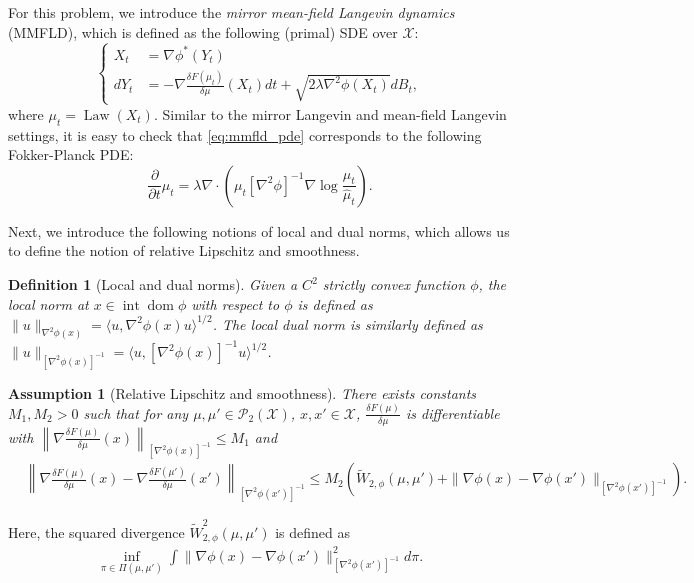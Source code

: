 \documentclass{article}
\newtheorem{definition}{Definition}
\newtheorem{assumption}{Assumption}
\begin{document}
For this problem, we introduce the \emph{mirror mean-field Langevin dynamics} (MMFLD), which is defined as the following (primal) SDE over $\mathcal{X}$:
\begin{equation}\label{eq:mmfld_sde}
\begin{cases}
    X_t &= \nabla\phi^*(Y_t)\\
    dY_t &= -\nabla\frac{\delta F(\mu_t)}{\delta\mu}(X_t)dt + \sqrt{2\lambda\nabla^2\phi(X_t)}dB_t,
\end{cases}
\end{equation}
where $\mu_t = \operatorname{Law}(X_t)$. Similar to the mirror Langevin and mean-field Langevin settings, it is easy to check that \eqref{eq:mmfld_pde} corresponds to the following Fokker-Planck PDE: 
\begin{equation}
\frac{\partial}{\partial t}\mu_t = \lambda \nabla \cdot \left(\mu_t [\nabla^2\phi]^{-1}\nabla \log \frac{\mu_t}{\hat{\mu}_t}\right).\label{eq:mmfld_pde}   
\end{equation}

Next, we introduce the following notions of local and dual norms, which allows us to define the notion of relative Lipschitz and smoothness.
\begin{definition}[Local and dual norms]
    Given a $C^2$ strictly convex function $\phi$, the local norm at $x\in \operatorname{int}\operatorname{dom}\phi$ with respect to $\phi$ is defined as $\|u\|_{\nabla^2\phi(x)}=\langle u, \nabla^2\phi(x)u\rangle^{1/2}$. The local dual norm is similarly defined as $\|u\|_{[\nabla^2\phi(x)]^{-1}} = \langle u, [\nabla^2\phi(x)]^{-1}u\rangle^{1/2}$.
\end{definition}

\begin{assumption}[Relative Lipschitz and smoothness]\label{asmp:rel_lip_and_smooth}
There exists constants $M_1, M_2>0$ such that for any $\mu,\mu'\in\mathcal{P}_2(\mathcal{X})$, $x,x'\in\mathcal{X}$, $\frac{\delta F(\mu)}{\delta\mu}$ is differentiable with $\left\|\nabla \frac{\delta F(\mu)}{\delta\mu}(x)\right\|_{[\nabla^2\phi(x)]^{-1}}\le M_1$ and 
    \begin{align*}
    &\left\|\nabla \frac{\delta F(\mu)}{\delta\mu}(x) - \nabla\frac{\delta F(\mu')}{\delta\mu}(x')\right\|_{[\nabla^2\phi(x')]^{-1}}\le M_2(\widetilde{W}_{2,\phi}(\mu,\mu') +\|\nabla\phi(x)-\nabla\phi(x')\|_{[\nabla^2\phi(x')]^{-1}}).
    \end{align*}
\end{assumption}
Here, the squared divergence $\widetilde{W}_{2,\phi}^2(\mu,\mu')$ is defined as
\begin{align*}
\inf_{\pi\in \Pi(\mu,\mu')} \int \|\nabla \phi(x)-\nabla\phi(x')\|_{[\nabla^2\phi(x')]^{-1}}^2d\pi.
\end{align*}
\end{document}
